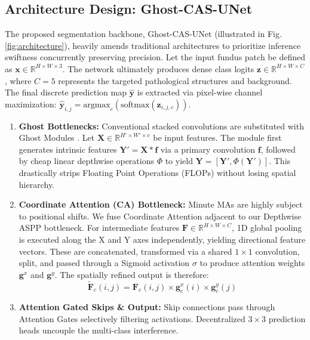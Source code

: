 \subsection{Architecture Design: Ghost-CAS-UNet}
The proposed segmentation backbone, Ghost-CAS-UNet (illustrated in Fig. \ref{fig:architecture}), heavily amends traditional architectures to prioritize inference swiftness concurrently preserving precision. Let the input fundus patch be defined as \(\mathbf{x} \in \mathbb{R}^{H \times W \times 3}\). The network ultimately produces dense class logits \(\mathbf{z} \in \mathbb{R}^{H \times W \times C}\), where \(C=5\) represents the targeted pathological structures and background. The final discrete prediction map \(\mathbf{\hat{y}}\) is extracted via pixel-wise channel maximization: \(\mathbf{\hat{y}}_{i,j} = \text{argmax}_c (\text{softmax}(\mathbf{z}_{i,j,c}))\).

\begin{enumerate}
    \item \textbf{Ghost Bottlenecks:} Conventional stacked convolutions are substituted with Ghost Modules \cite{ghostnet_2020}. Let \(\mathbf{X} \in \mathbb{R}^{H' \times W' \times c}\) be input features. The module first generates intrinsic features \(\mathbf{Y}' = \mathbf{X} * \mathbf{f}\) via a primary convolution \(\mathbf{f}\), followed by cheap linear depthwise operations \(\Phi\) to yield \(\mathbf{Y} = [\mathbf{Y}', \Phi(\mathbf{Y}')]\). This drastically strips Floating Point Operations (FLOPs) without losing spatial hierarchy. 
    \item \textbf{Coordinate Attention (CA) Bottleneck:} Minute MAs are highly subject to positional shifts. We fuse Coordinate Attention \cite{coord_attn_2021} adjacent to our Depthwise ASPP bottleneck. For intermediate features \(\mathbf{F} \in \mathbb{R}^{H \times W \times C}\), 1D global pooling is executed along the X and Y axes independently, yielding directional feature vectors. These are concatenated, transformed via a shared \(1 \times 1\) convolution, split, and passed through a Sigmoid activation \(\sigma\) to produce attention weights \(\mathbf{g}^x\) and \(\mathbf{g}^y\). The spatially refined output is therefore:
    \begin{equation}
    \mathbf{\tilde{F}}_{c}(i,j) = \mathbf{F}_{c}(i,j) \times \mathbf{g}^x_{c}(i) \times \mathbf{g}^y_{c}(j)
    \end{equation}
    \item \textbf{Attention Gated Skips \& Output:} Skip connections pass through Attention Gates \cite{attention_unet_2018} selectively filtering activations. Decentralized \(3 \times 3\) prediction heads uncouple the multi-class interference.
\end{enumerate}

